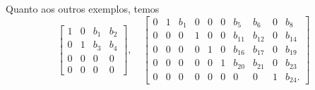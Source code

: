 Quanto aos outros exemplos, temos
\begin{equation}
\left[
\begin{array}{cccc}
1 & 0 & b_1 & b_2 \\
0 & 1 & b_3 & b_4 \\
0 & 0 & 0 & 0 \\
0 & 0 & 0 & 0
\end{array}
\right], \quad
\left[
\begin{array}{cccccccccc}
0 & 1 & b_1 & 0 & 0 & 0 & b_5 & b_6 & 0 & b_8 \\
0 & 0 & 0 & 1 & 0 &0 & b_{11} & b_{12} & 0 & b_{14} \\
0 & 0 & 0 & 0 & 1 & 0 & b_{16} & b_{17} & 0 & b_{19} \\
0 & 0 & 0 & 0 & 0 & 1 & b_{20} & b_{21} & 0 & b_{23} \\
0 & 0 & 0 & 0 & 0 & 0 & 0 & 0 & 1 & b_{24}.
\end{array}
\right]
\end{equation}

